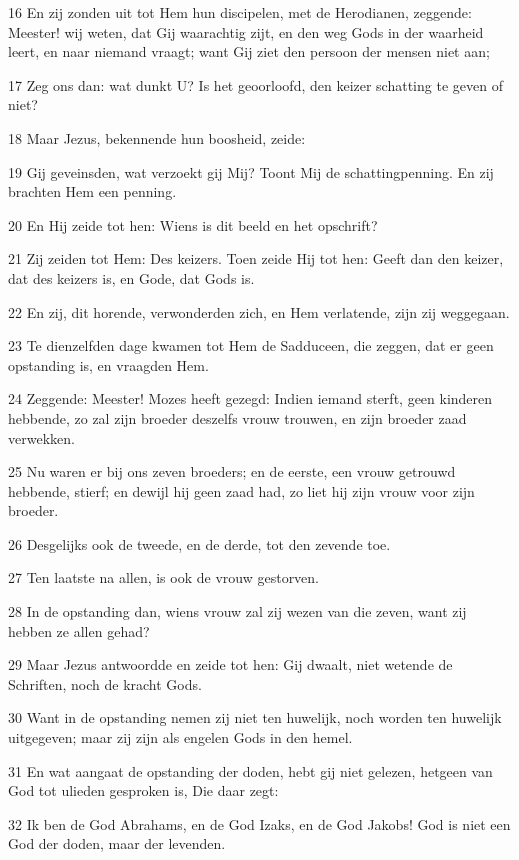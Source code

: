 \par 16 En zij zonden uit tot Hem hun discipelen, met de Herodianen, zeggende: Meester! wij weten, dat Gij waarachtig zijt, en den weg Gods in der waarheid leert, en naar niemand vraagt; want Gij ziet den persoon der mensen niet aan;
\par 17 Zeg ons dan: wat dunkt U? Is het geoorloofd, den keizer schatting te geven of niet?
\par 18 Maar Jezus, bekennende hun boosheid, zeide:
\par 19 Gij geveinsden, wat verzoekt gij Mij? Toont Mij de schattingpenning. En zij brachten Hem een penning.
\par 20 En Hij zeide tot hen: Wiens is dit beeld en het opschrift?
\par 21 Zij zeiden tot Hem: Des keizers. Toen zeide Hij tot hen: Geeft dan den keizer, dat des keizers is, en Gode, dat Gods is.
\par 22 En zij, dit horende, verwonderden zich, en Hem verlatende, zijn zij weggegaan.
\par 23 Te dienzelfden dage kwamen tot Hem de Sadduceen, die zeggen, dat er geen opstanding is, en vraagden Hem.
\par 24 Zeggende: Meester! Mozes heeft gezegd: Indien iemand sterft, geen kinderen hebbende, zo zal zijn broeder deszelfs vrouw trouwen, en zijn broeder zaad verwekken.
\par 25 Nu waren er bij ons zeven broeders; en de eerste, een vrouw getrouwd hebbende, stierf; en dewijl hij geen zaad had, zo liet hij zijn vrouw voor zijn broeder.
\par 26 Desgelijks ook de tweede, en de derde, tot den zevende toe.
\par 27 Ten laatste na allen, is ook de vrouw gestorven.
\par 28 In de opstanding dan, wiens vrouw zal zij wezen van die zeven, want zij hebben ze allen gehad?
\par 29 Maar Jezus antwoordde en zeide tot hen: Gij dwaalt, niet wetende de Schriften, noch de kracht Gods.
\par 30 Want in de opstanding nemen zij niet ten huwelijk, noch worden ten huwelijk uitgegeven; maar zij zijn als engelen Gods in den hemel.
\par 31 En wat aangaat de opstanding der doden, hebt gij niet gelezen, hetgeen van God tot ulieden gesproken is, Die daar zegt:
\par 32 Ik ben de God Abrahams, en de God Izaks, en de God Jakobs! God is niet een God der doden, maar der levenden.
